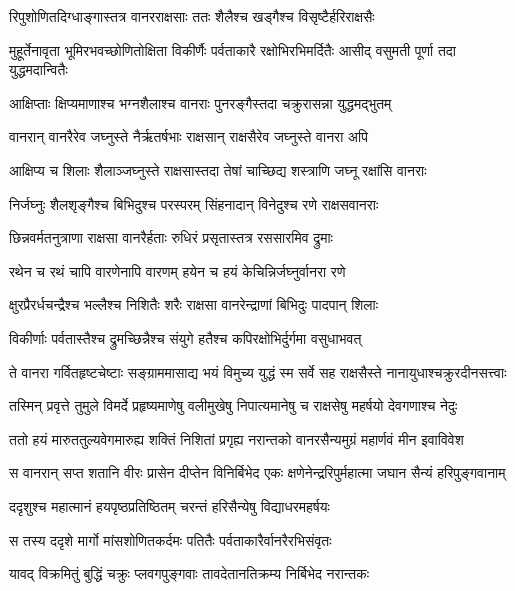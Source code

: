 \twolineshloka
{रिपुशोणितदिग्धाङ्गास्तत्र वानरराक्षसाः}
{ततः शैलैश्च खड्गैश्च विसृष्टैर्हरिराक्षसैः} %

\threelineshloka
{मुहूर्तेनावृता भूमिरभवच्छोणितोक्षिता}
{विकीर्णैः पर्वताकारै रक्षोभिरभिमर्दितैः}
{आसीद् वसुमती पूर्णा तदा युद्धमदान्वितैः} %

\twolineshloka
{आक्षिप्ताः क्षिप्यमाणाश्च भग्नशैलाश्च वानराः}
{पुनरङ्गैस्तदा चक्रुरासन्ना युद्धमद्भुतम्} %

\twolineshloka
{वानरान् वानरैरेव जघ्नुस्ते नैर्ऋतर्षभाः}
{राक्षसान् राक्षसैरेव जघ्नुस्ते वानरा अपि} %

\twolineshloka
{आक्षिप्य च शिलाः शैलाञ्जघ्नुस्ते राक्षसास्तदा}
{तेषां चाच्छिद्य शस्त्राणि जघ्नू रक्षांसि वानराः} %

\twolineshloka
{निर्जघ्नुः शैलशृङ्गैश्च बिभिदुश्च परस्परम्}
{सिंहनादान् विनेदुश्च रणे राक्षसवानराः} %

\twolineshloka
{छिन्नवर्मतनुत्राणा राक्षसा वानरैर्हताः}
{रुधिरं प्रसृतास्तत्र रससारमिव द्रुमाः} %

\twolineshloka
{रथेन च रथं चापि वारणेनापि वारणम्}
{हयेन च हयं केचिन्निर्जघ्नुर्वानरा रणे} %

\twolineshloka
{क्षुरप्रैरर्धचन्द्रैश्च भल्लैश्च निशितैः शरैः}
{राक्षसा वानरेन्द्राणां बिभिदुः पादपान् शिलाः} %

\twolineshloka
{विकीर्णाः पर्वतास्तैश्च द्रुमच्छिन्नैश्च संयुगे}
{हतैश्च कपिरक्षोभिर्दुर्गमा वसुधाभवत्} %

\twolineshloka
{ते वानरा गर्वितहृष्टचेष्टाः सङ्ग्राममासाद्य भयं विमुच्य}
{युद्धं स्म सर्वे सह राक्षसैस्ते नानायुधाश्चक्रुरदीनसत्त्वाः} %

\twolineshloka
{तस्मिन् प्रवृत्ते तुमुले विमर्दे प्रहृष्यमाणेषु वलीमुखेषु}
{निपात्यमानेषु च राक्षसेषु महर्षयो देवगणाश्च नेदुः} %

\twolineshloka
{ततो हयं मारुततुल्यवेगमारुह्य शक्तिं निशितां प्रगृह्य}
{नरान्तको वानरसैन्यमुग्रं महार्णवं मीन इवाविवेश} %

\twolineshloka
{स वानरान् सप्त शतानि वीरः प्रासेन दीप्तेन विनिर्बिभेद}
{एकः क्षणेनेन्द्ररिपुर्महात्मा जघान सैन्यं हरिपुङ्गवानाम्} %

\twolineshloka
{ददृशुश्च महात्मानं हयपृष्ठप्रतिष्ठितम्}
{चरन्तं हरिसैन्येषु विद्याधरमहर्षयः} %

\twolineshloka
{स तस्य ददृशे मार्गो मांसशोणितकर्दमः}
{पतितैः पर्वताकारैर्वानरैरभिसंवृतः} %

\twolineshloka
{यावद् विक्रमितुं बुद्धिं चक्रुः प्लवगपुङ्गवाः}
{तावदेतानतिक्रम्य निर्बिभेद नरान्तकः} %

